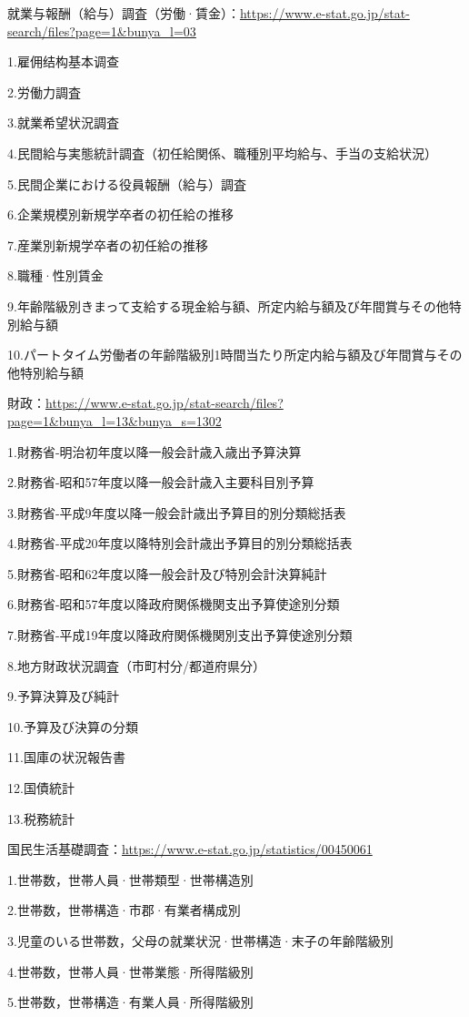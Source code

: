 就業与報酬（給与）調査（労働·賃金）：\url{https://www.e-stat.go.jp/stat-search/files?page=1&bunya_l=03}

1.雇佣结构基本调查

2.労働力調査

3.就業希望状況調査

4.民間給与実態統計調査（初任給関係、職種別平均給与、手当の支給状況）

5.民間企業における役員報酬（給与）調査

6.企業規模別新規学卒者の初任給の推移

7.産業別新規学卒者の初任給の推移

8.職種·性別賃金

9.年齢階級別きまって支給する現金給与額、所定内給与額及び年間賞与その他特別給与額

10.パートタイム労働者の年齢階級別1時間当たり所定内給与額及び年間賞与その他特別給与額

財政：\url{https://www.e-stat.go.jp/stat-search/files?page=1&bunya_l=13&bunya_s=1302}

1.財務省-明治初年度以降一般会計歳入歳出予算決算

2.財務省-昭和57年度以降一般会計歳入主要科目別予算

3.財務省-平成9年度以降一般会計歳出予算目的別分類総括表

4.財務省-平成20年度以降特別会計歳出予算目的別分類総括表

5.財務省-昭和62年度以降一般会計及び特別会計決算純計

6.財務省-昭和57年度以降政府関係機関支出予算使途別分類

7.財務省-平成19年度以降政府関係機関別支出予算使途別分類

8.地方財政状況調査（市町村分/都道府県分）

9.予算決算及び純計

10.予算及び決算の分類

11.国庫の状況報告書

12.国債統計

13.税務統計

国民生活基礎調査：\url{https://www.e-stat.go.jp/statistics/00450061}

1.世帯数，世帯人員·世帯類型·世帯構造別

2.世帯数，世帯構造·市郡·有業者構成別

3.児童のいる世帯数，父母の就業状況·世帯構造·末子の年齢階級別

4.世帯数，世帯人員·世帯業態·所得階級別

5.世帯数，世帯構造·有業人員·所得階級別


